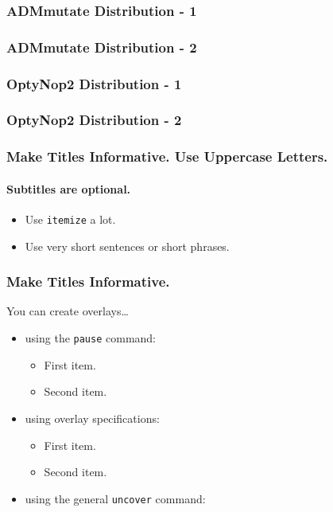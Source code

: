 \documentclass{beamer}
\begin{document}
\begin{frame}[fragile]
  \frametitle{ADMmutate Distribution - 1}
  
\end{frame}
\begin{frame}[fragile]
  \frametitle{ADMmutate Distribution - 2}
  
\end{frame}
\begin{frame}[fragile]
  \frametitle{OptyNop2 Distribution - 1}
  
\end{frame}
\begin{frame}[fragile]
  \frametitle{OptyNop2 Distribution - 2}
  
\end{frame}

\begin{frame}
  \frametitle{Make Titles Informative. Use Uppercase Letters.}
  \framesubtitle{Subtitles are optional.}

  \begin{itemize}
  \item
    Use \texttt{itemize} a lot.
  \item
    Use very short sentences or short phrases.
  \end{itemize}
\end{frame}

\begin{frame}
  \frametitle{Make Titles Informative.}

  You can create overlays\dots
  \begin{itemize}
  \item using the \texttt{pause} command:
    \begin{itemize}
    \item
      First item.
      \pause
    \item    
      Second item.
    \end{itemize}
  \item
    using overlay specifications:
    \begin{itemize}
    \item<3->
      First item.
    \item<4->
      Second item.
    \end{itemize}
  \item
    using the general \texttt{uncover} command:
    \begin{itemize}
    \end{itemize}
  \end{itemize}
\end{frame}
\end{document}
